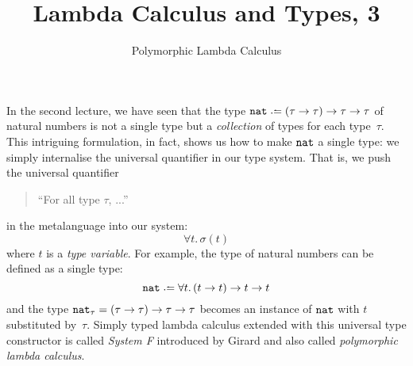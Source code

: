 \title{Lambda Calculus and Types, 3}
\subtitle{Polymorphic Lambda Calculus}

\begin{frame}
\maketitle
\end{frame}

In the second lecture, we have seen that the type $\nat \defeq (\tau \to \tau)
\to \tau \to \tau$ of natural numbers is not a single type but a
\emph{collection} of types for each type~$\tau$. This intriguing formulation, in
fact, shows us how to make $\mathtt{nat}$ a single type: we simply internalise the
universal quantifier in our type system. That is, we push the universal
quantifier 
\begin{quote}
``For all type $\tau$, ...''
\end{quote}
in the metalanguage into our system:
\[
  \forall t.\, \sigma(t)
\]
where $t$ is a \emph{type variable}. For example, the type of natural numbers
can be defined as a single type:
\[
  \nat \defeq \forall t.\, (t \to t) \to t \to t
\]
and the type $\mathtt{nat}_\tau = (\tau \to \tau) \to \tau \to \tau$ becomes an instance
of $\mathtt{nat}$ with $t$ substituted by~$\tau$.  Simply
typed lambda calculus extended with this universal type constructor is called
\emph{System F} introduced by Girard and also called \emph{polymorphic lambda
  calculus}.

